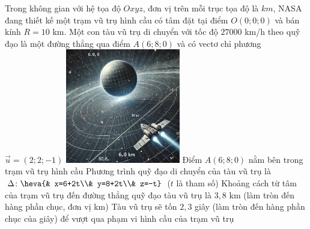 \begin{ex}%
\immini
{
    Trong không gian với hệ tọa độ $Oxyz$, đơn vị trên mỗi trục tọa độ là $km$, NASA đang thiết kế một trạm vũ trụ hình cầu có tâm đặt tại điểm $ O(0;0;0)$ và bán kính $R=10$ km. Một con tàu vũ trụ di chuyển với tốc độ $ 27000$ km/h theo quỹ đạo là một đường thẳng qua điểm $ A(6;8;0)$ và có vectơ chỉ phương $\vec{u}=(2;2;-1)$
}
{
    \includegraphics[width=5cm]{img/HXN-11-16}
}
 \choiceTF
 {Điểm $ A(6;8;0)$ nằm bên trong trạm vũ trụ hình cầu}
 {\True Phương trình quỹ đạo di chuyển của tàu vũ trụ là $\Delta \colon \heva{& x=6+2t\\& y=8+2t\\& z=-t}$ ($t$ là tham số)}
 {Khoảng cách từ tâm của trạm vũ trụ đến đường thẳng quỹ đạo tàu vũ trụ là $3{,}8$ km (làm tròn đến hàng phần chục, đơn vị km)}
 {Tàu vũ trụ sẽ tốn $2{,}3$ giây (làm tròn đến hàng phần chục của giây) để vượt qua phạm vi hình cầu của trạm vũ trụ}
\end{ex}
